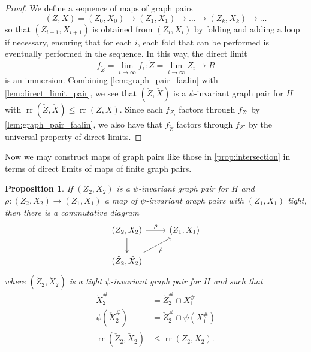 \documentclass[11pt, a4paper]{amsart}
\newtheorem{proposition}[theorem]{Proposition}
\theoremstyle{definition}
\DeclareMathOperator{\rr}{rr}
\begin{document}
\begin{proof}
We define a sequence of maps of graph pairs
\[
(Z, X) = (Z_0, X_0) \to (Z_1, X_1)\to \ldots \to (Z_k, X_k)\to \ldots
\]
so that $(Z_{i+1}, X_{i+1})$ is obtained from $(Z_i, X_i)$ by folding and adding a loop if necessary, ensuring that for each $i$, each fold that can be performed is eventually performed in the sequence. In this way, the direct limit 
\[
f_{\check{Z}} = \lim_{i\to \infty}f_i\colon \check{Z} = \lim_{i\to \infty}Z_i \to R
\]
is an immersion. Combining \cref{lem:graph_pair_faalin} with \cref{lem:direct_limit_pair}, we see that $(\check{Z}, \check{X})$ is a $\psi$-invariant graph pair for $H$ with $\rr(\check{Z}, \check{X}) \leqslant \rr(Z, X)$. Since each $f_{Z_i}$ factors through $f_{Z'}$ by \cref{lem:graph_pair_faalin}, we also have that $f_{\check{Z}}$ factors through $f_{Z'}$ by the universal property of direct limits.
\end{proof}


Now we may construct maps of graph pairs like those in \cref{prop:intersection} in terms of direct limits of maps of finite graph pairs.

\begin{proposition}
\label{prop:induced_pair}
If $(Z_2, X_2)$ is a $\psi$-invariant graph pair for $H$ and $\rho\colon (Z_2, X_2)\to (Z_1, X_1)$ a map of $\psi$-invariant graph pairs with $(Z_1, X_1)$ tight, then there is a commutative diagram
\[
\begin{tikzcd}
{(Z_2, X_2)} \arrow[d] \arrow[r, "\rho"]                & {(Z_1, X_1)} \\
{(\check{Z}_2, \check{X}_2)} \arrow[ru, "\check{\rho}"'] &             
\end{tikzcd}
\]
where $(\check{Z}_2, \check{X}_2)$ is a tight $\psi$-invariant graph pair for $H$ and such that
\begin{align*}
\check{X}_2^{\#} &= \check{Z}_2^{\#}\cap X_1^{\#}\\
\psi(\check{X}_2^{\#}) &= \check{Z}_2^{\#}\cap \psi(X_1^{\#})\\
\rr(\check{Z}_2, \check{X}_2)&\leqslant \rr(Z_2, X_2).
\end{align*}
\end{proposition}
\end{document}
